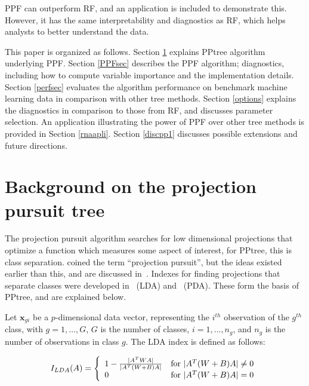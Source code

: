 \documentclass[12pt]{article}\usepackage[]{graphicx}\usepackage[]{color}
\begin{document}
PPF can outperform RF, and an application is included to demonstrate this. However, it has the same interpretability and diagnostics as RF, which helps analysts to better understand the data.

This paper is organized as follows. Section \ref{PPT} explains PPtree algorithm underlying PPF. Section \ref{PPFsec} describes the PPF algorithm; diagnostics, including how to compute variable importance and the implementation details. Section \ref{perfsec} evaluates the algorithm performance on benchmark machine learning data in comparison with other tree methods. Section \ref{options} explains the diagnostics in comparison to those from RF, and discusses parameter selection. An application illustrating the power of PPF over other tree methods is provided in Section \ref{rnaapli}. Section \ref{discpp1} discusses possible extensions and future directions.

\section{Background on the projection pursuit tree}
\label{PPT}





The projection pursuit algorithm searches for low dimensional projections that optimize a function which measures some aspect of interest, for PPtree, this is class separation. \cite{friedman1973projection} coined the term ``projection pursuit'', but the ideas existed earlier than this, and are discussed in~\cite{kruskal1969toward}. Indexes for finding projections that separate classes were developed in~\cite{lee2005projection} (LDA) and~\cite{lee2010projection} (PDA). These form the basis of PPtree, and are explained below.

Let $\mathbf{x}_{gi}$ be a $p$-dimensional data vector, representing the $i^{th}$ observation of the $g^{th}$ class, with $g = 1,\ldots, G$, $G$ is the number of classes, $i = 1,\ldots , n_g$, and $n_g$ is the number of observations in class $g$. The LDA index is defined as follows:

\begin{equation}
 I_{LDA}(A) = \left\{
  \begin{array}{l l}
    1-\frac{|A^T WA|}{|A^T(W+B)A|} &  \text{for}~|A^T(W+B)A|\neq 0\\
    0 &  \text{for}~|A^T(W+B)A|= 0
  \end{array} \right.
  \end{equation}
\end{document}
